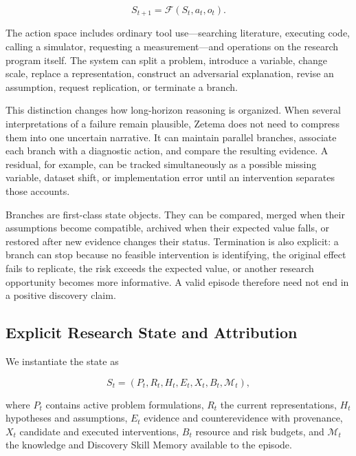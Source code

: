 \documentclass[11pt, a4paper, copyright]{google}
\begin{document}
\begin{equation}
S_{t+1}=\mathcal{F}(S_t,a_t,o_t).
\label{eq:zetema-state-update}
\end{equation}

The action space includes ordinary tool use---searching literature, executing code, calling a simulator, requesting a measurement---and operations on the research program itself. The system can split a problem, introduce a variable, change scale, replace a representation, construct an adversarial explanation, revise an assumption, request replication, or terminate a branch.

This distinction changes how long-horizon reasoning is organized. When several interpretations of a failure remain plausible, Zetema does not need to compress them into one uncertain narrative. It can maintain parallel branches, associate each branch with a diagnostic action, and compare the resulting evidence. A residual, for example, can be tracked simultaneously as a possible missing variable, dataset shift, or implementation error until an intervention separates those accounts.

Branches are first-class state objects. They can be compared, merged when their assumptions become compatible, archived when their expected value falls, or restored after new evidence changes their status. Termination is also explicit: a branch can stop because no feasible intervention is identifying, the original effect fails to replicate, the risk exceeds the expected value, or another research opportunity becomes more informative. A valid episode therefore need not end in a positive discovery claim.

\subsection{Explicit Research State and Attribution}
\label{subsec:explicit-research-state}

We instantiate the state as

\begin{equation}
S_t=(P_t,R_t,H_t,E_t,X_t,B_t,\mathcal{M}_t),
\label{eq:explicit-research-state}
\end{equation}

where $P_t$ contains active problem formulations, $R_t$ the current representations, $H_t$ hypotheses and assumptions, $E_t$ evidence and counterevidence with provenance, $X_t$ candidate and executed interventions, $B_t$ resource and risk budgets, and $\mathcal{M}_t$ the knowledge and Discovery Skill Memory available to the episode.
\end{document}
